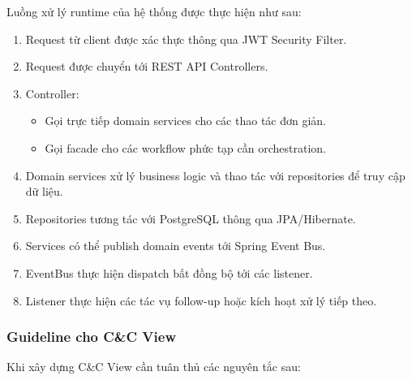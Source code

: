 Luồng xử lý runtime của hệ thống được thực hiện như sau:

\begin{enumerate}
    \item Request từ client được xác thực thông qua JWT Security Filter.
    
    \item Request được chuyển tới REST API Controllers.
    
    \item Controller:
    \begin{itemize}
        \item Gọi trực tiếp domain services cho các thao tác đơn giản.
        \item Gọi facade cho các workflow phức tạp cần orchestration.
    \end{itemize}
    
    \item Domain services xử lý business logic và thao tác với repositories để truy cập dữ liệu.
    
    \item Repositories tương tác với PostgreSQL thông qua JPA/Hibernate.
    
    \item Services có thể publish domain events tới Spring Event Bus.
    
    \item EventBus thực hiện dispatch bất đồng bộ tới các listener.
    
    \item Listener thực hiện các tác vụ follow-up hoặc kích hoạt xử lý tiếp theo.
\end{enumerate}

\subsubsection*{Guideline cho C\&C View}

Khi xây dựng C\&C View cần tuân thủ các nguyên tắc sau:

